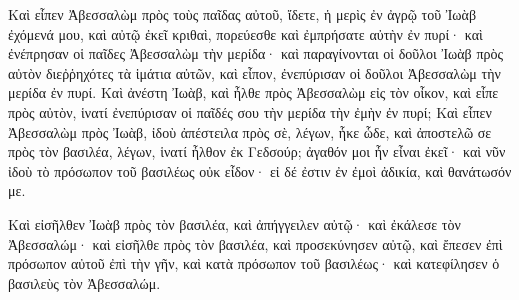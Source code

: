 {Καὶ εἶπεν Ἀβεσσαλὼμ πρὸς τοὺς παῖδας αὐτοῦ, ἴδετε, ἡ μερὶς ἐν ἀγρῷ τοῦ Ἰωὰβ ἐχόμενά μου, καὶ αὐτῷ ἐκεῖ κριθαὶ, πορεύεσθε καὶ ἐμπρήσατε αὐτὴν ἐν πυρί· καὶ ἐνέπρησαν οἱ παῖδες Ἀβεσσαλὼμ τὴν μερίδα· καὶ παραγίνονται οἱ δοῦλοι Ἰωὰβ πρὸς αὐτὸν διεῤῥηχότες τὰ ἱμάτια αὐτῶν, καὶ εἶπον, ἐνεπύρισαν οἱ δοῦλοι Ἀβεσσαλὼμ τὴν μερίδα ἐν πυρί.
Καὶ ἀνέστη Ἰωὰβ, καὶ ἦλθε πρὸς Ἀβεσσαλὼμ εἰς τὸν οἶκον, καὶ εἶπε πρὸς αὐτὸν, ἱνατί ἐνεπύρισαν οἱ παῖδές σου τὴν μερίδα τὴν ἐμὴν ἐν πυρί;
Καὶ εἶπεν Ἀβεσσαλὼμ πρὸς Ἰωὰβ, ἰδοὺ ἀπέστειλα πρὸς σὲ, λέγων, ἧκε ὧδε, καὶ ἀποστελῶ σε πρὸς τὸν βασιλέα, λέγων, ἱνατί ἦλθον ἐκ Γεδσούρ; ἀγαθόν μοι ἦν εἶναι ἐκεῖ· καὶ νῦν ἰδοὺ τὸ πρόσωπον τοῦ βασιλέως οὐκ εἶδον· εἰ δέ ἐστιν ἐν ἐμοὶ ἀδικία, καὶ θανάτωσόν με.
\par }{\PP {}Καὶ εἰσῆλθεν Ἰωὰβ πρὸς τὸν βασιλέα, καὶ ἀπήγγειλεν αὐτῷ· καὶ ἐκάλεσε τὸν Ἀβεσσαλώμ· καὶ εἰσῆλθε πρὸς τὸν βασιλέα, καὶ προσεκύνησεν αὐτῷ, καὶ ἔπεσεν ἐπὶ πρόσωπον αὐτοῦ ἐπὶ τὴν γῆν, καὶ κατὰ πρόσωπον τοῦ βασιλέως· καὶ κατεφίλησεν ὁ βασιλεὺς τὸν Ἀβεσσαλώμ.

}
